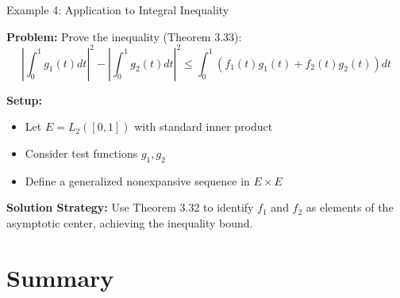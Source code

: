 \documentclass[aspectratio=169,10pt]{beamer}
\begin{document}
\begin{frame}[fragile]{Example 4: Application to Integral Inequality}
    \begin{example}
        \textbf{Problem:} Prove the inequality (Theorem 3.33):
        \[
        \left|\int_0^1 g_1(t) dt\right|^2 - \left|\int_0^1 g_2(t) dt\right|^2 \leq \int_0^1 (f_1(t)g_1(t) + f_2(t)g_2(t)) dt
        \]

        \textbf{Setup:}
        \begin{itemize}
            \item Let $E = L_2([0,1])$ with standard inner product
            \item Consider test functions $g_1, g_2$
            \item Define a generalized nonexpansive sequence in $E \times E$
        \end{itemize}

        \textbf{Solution Strategy:}
        Use Theorem 3.32 to identify $f_1$ and $f_2$ as elements of the asymptotic center, achieving the inequality bound.
    \end{example}
\end{frame}

\section{Summary}
\end{document}
